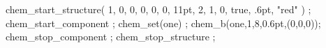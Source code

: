 \startTEXpage

\bgroup
        chem_start_structure(
            1,     %
            0,     %
            0,     %
            0,     %
            0,     %
            0,     %
            11pt,  %
            2,     %
            1,     %
            0,     %
            true,  %
            .6pt,  %
            "red"    %
        ) ;
        chem_start_component ;
        chem_set(one) ;
        chem_b(one,1,8,0.6pt,(0,0,0));
        chem_stop_component ;
        chem_stop_structure ;
    \stopMPcode
\egroup

\bgroup
    \startchemical
        \chemical[SIX,B,R]
    \stopchemical
\egroup

\stopTEXpage
